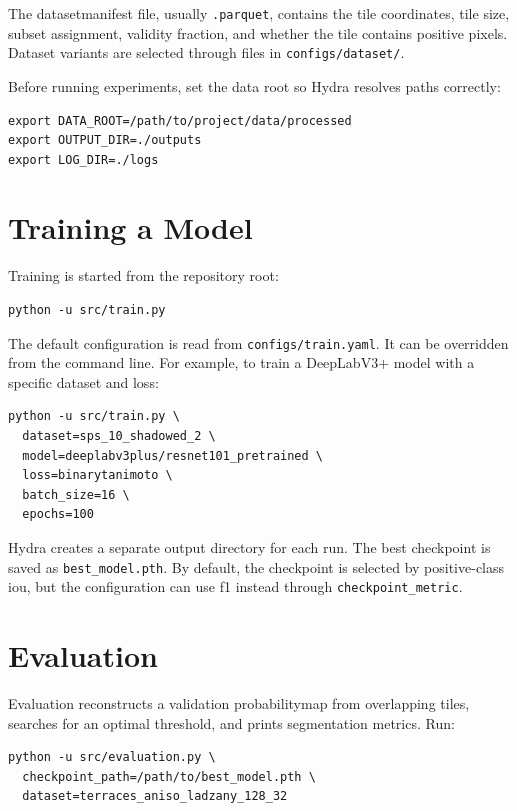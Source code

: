 \begin{sloppypar}
The \gls{datasetmanifest} file, usually \texttt{.parquet}, contains the tile coordinates, tile size, subset assignment, validity fraction, and whether the tile contains positive pixels. Dataset variants are selected through files in \texttt{configs/dataset/}.

Before running experiments, set the data root so Hydra resolves paths correctly:

\begin{verbatim}
export DATA_ROOT=/path/to/project/data/processed
export OUTPUT_DIR=./outputs
export LOG_DIR=./logs
\end{verbatim}

\section{Training a Model}

Training is started from the repository root:

\begin{verbatim}
python -u src/train.py
\end{verbatim}

The default configuration is read from \texttt{configs/train.yaml}. It can be overridden from the command line. For example, to train a DeepLabV3+ model with a specific dataset and loss:

\begin{verbatim}
python -u src/train.py \
  dataset=sps_10_shadowed_2 \
  model=deeplabv3plus/resnet101_pretrained \
  loss=binarytanimoto \
  batch_size=16 \
  epochs=100
\end{verbatim}

Hydra creates a separate output directory for each run. The best checkpoint is saved as \texttt{best\_model.pth}. By default, the checkpoint is selected by positive-class \gls{iou}, but the configuration can use \gls{f1} instead through \texttt{checkpoint\_metric}.

\section{Evaluation}

Evaluation reconstructs a validation \gls{probabilitymap} from overlapping tiles, searches for an optimal threshold, and prints segmentation metrics. Run:

\begin{verbatim}
python -u src/evaluation.py \
  checkpoint_path=/path/to/best_model.pth \
  dataset=terraces_aniso_ladzany_128_32
\end{verbatim}


\end{sloppypar}
